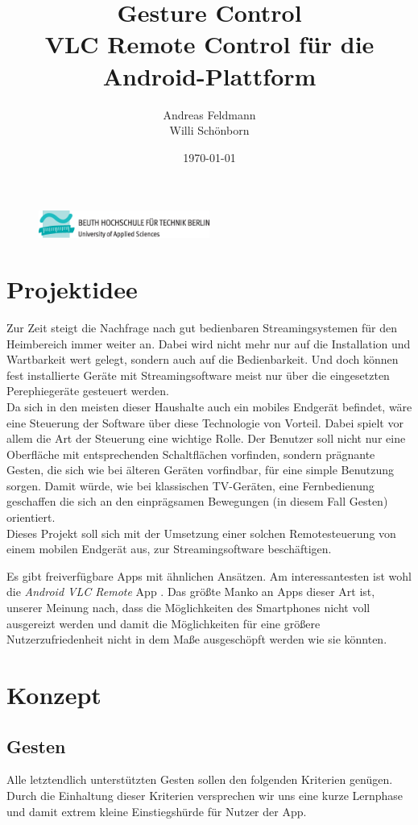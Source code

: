\documentclass[a4paper,12pt]{article}
\title{Gesture Control \\ VLC Remote Control für die Android-Plattform}
\author{Andreas Feldmann \\ Willi Schönborn}
\date{\today}
\begin{document}
\begin{figure}[H]
\centering
\includegraphics[width=0.5\textwidth]{beuth.eps}
\maketitle
\end{figure}

\section*{Projektidee}
Zur Zeit steigt die Nachfrage nach gut bedienbaren Streamingsystemen für den Heimbereich immer weiter an. Dabei wird nicht mehr nur auf die Installation und Wartbarkeit wert gelegt, sondern auch auf die Bedienbarkeit. Und doch können fest installierte Geräte mit Streamingsoftware meist nur über die eingesetzten Perephiegeräte gesteuert werden. \\
Da sich in den meisten dieser Haushalte auch ein mobiles Endgerät befindet, wäre eine Steuerung der Software über diese Technologie von Vorteil. Dabei spielt vor allem die Art der Steuerung eine wichtige Rolle. Der Benutzer soll nicht nur eine Oberfläche mit entsprechenden Schaltflächen vorfinden, sondern prägnante Gesten, die sich wie bei älteren Geräten vorfindbar, für eine simple Benutzung sorgen. Damit würde, wie bei klassischen TV-Geräten, eine Fernbedienung geschaffen die sich an den einprägsamen Bewegungen (in diesem Fall Gesten) orientiert. \\
Dieses Projekt soll sich mit der Umsetzung einer solchen Remotesteuerung von einem mobilen Endgerät aus, zur Streamingsoftware beschäftigen.

Es gibt freiverfügbare Apps mit ähnlichen Ansätzen. Am interessantesten ist wohl die \textit{Android VLC Remote} App \cite{android-vlc-remote}. Das größte Manko an Apps dieser Art ist, unserer Meinung nach, dass die Möglichkeiten des Smartphones nicht voll ausgereizt werden und damit die Möglichkeiten für eine größere Nutzerzufriedenheit nicht in dem Maße ausgeschöpft werden wie sie könnten.

\newpage
\section*{Konzept}

\subsection*{Gesten}
Alle letztendlich unterstützten Gesten sollen den folgenden Kriterien genügen. Durch die Einhaltung dieser Kriterien versprechen wir uns eine kurze Lernphase und damit extrem kleine Einstiegshürde für Nutzer der App.
\end{document}
